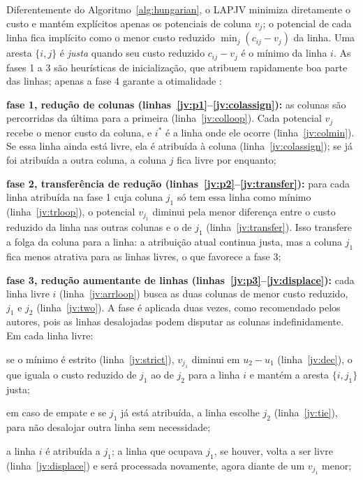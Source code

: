 Diferentemente do Algoritmo~\ref{alg:hungarian}, o LAPJV minimiza diretamente o custo e mantém explícitos apenas os potenciais de coluna $v_j$; o potencial de cada linha fica implícito como o menor custo reduzido $\min_j (c_{ij} - v_j)$ da linha. Uma aresta $\{i,j\}$ é \textit{justa} quando seu custo reduzido $c_{ij} - v_j$ é o mínimo da linha $i$. As fases 1 a 3 são heurísticas de inicialização, que atribuem rapidamente boa parte das linhas; apenas a fase 4 garante a otimalidade \cite{jonker}:

\begin{alineas}
    \item \textbf{fase 1, redução de colunas (linhas~\ref{jv:p1}--\ref{jv:colassign}):} as colunas são percorridas da última para a primeira (linha~\ref{jv:colloop}). Cada potencial $v_j$ recebe o menor custo da coluna, e $i^*$ é a linha onde ele ocorre (linha~\ref{jv:colmin}). Se essa linha ainda está livre, ela é atribuída à coluna (linha~\ref{jv:colassign}); se já foi atribuída a outra coluna, a coluna $j$ fica livre por enquanto;
    \item \textbf{fase 2, transferência de redução (linhas~\ref{jv:p2}--\ref{jv:transfer}):} para cada linha atribuída na fase 1 cuja coluna $j_1$ só tem essa linha como mínimo (linha~\ref{jv:trloop}), o potencial $v_{j_1}$ diminui pela menor diferença entre o custo reduzido da linha nas outras colunas e o de $j_1$ (linha~\ref{jv:transfer}). Isso transfere a folga da coluna para a linha: a atribuição atual continua justa, mas a coluna $j_1$ fica menos atrativa para as linhas livres, o que favorece a fase 3;
    \item \textbf{fase 3, redução aumentante de linhas (linhas~\ref{jv:p3}--\ref{jv:displace}):} cada linha livre $i$ (linha~\ref{jv:arrloop}) busca as duas colunas de menor custo reduzido, $j_1$ e $j_2$ (linha~\ref{jv:two}). A fase é aplicada duas vezes, como recomendado pelos autores, pois as linhas desalojadas podem disputar as colunas indefinidamente. Em cada linha livre:
    \begin{alineas}
        \item se o mínimo é estrito (linha~\ref{jv:strict}), $v_{j_1}$ diminui em $u_2 - u_1$ (linha~\ref{jv:dec}), o que iguala o custo reduzido de $j_1$ ao de $j_2$ para a linha $i$ e mantém a aresta $\{i, j_1\}$ justa;
        \item em caso de empate e se $j_1$ já está atribuída, a linha escolhe $j_2$ (linha~\ref{jv:tie}), para não desalojar outra linha sem necessidade;
        \item a linha $i$ é atribuída a $j_1$; a linha que ocupava $j_1$, se houver, volta a ser livre (linha~\ref{jv:displace}) e será processada novamente, agora diante de um $v_{j_1}$ menor;

\end{alineas}
\end{alineas}
